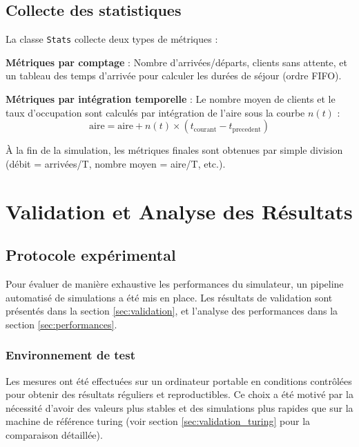 \documentclass[12pt,a4paper]{article}
\begin{document}
\subsection{Collecte des statistiques}

La classe \texttt{Stats} collecte deux types de métriques :

\textbf{Métriques par comptage} : Nombre d'arrivées/départs, clients sans attente, et un tableau des temps d'arrivée pour calculer les durées de séjour (ordre FIFO).

\textbf{Métriques par intégration temporelle} : Le nombre moyen de clients et le taux d'occupation sont calculés par intégration de l'aire sous la courbe $n(t)$ :
\begin{equation}
    \text{aire} = \text{aire} + n(t) \times (t_{\text{courant}} - t_{\text{precedent}})
\end{equation}

À la fin de la simulation, les métriques finales sont obtenues par simple division (débit = arrivées/T, nombre moyen = aire/T, etc.).


\section{Validation et Analyse des Résultats}

\subsection{Protocole expérimental}

Pour évaluer de manière exhaustive les performances du simulateur, un pipeline automatisé de simulations a été mis en place. Les résultats de validation sont présentés dans la section \ref{sec:validation}, et l'analyse des performances dans la section \ref{sec:performances}.

\subsubsection{Environnement de test}

Les mesures ont été effectuées sur un ordinateur portable en conditions contrôlées pour obtenir des résultats réguliers et reproductibles. Ce choix a été motivé par la nécessité d'avoir des valeurs plus stables et des simulations plus rapides que sur la machine de référence turing (voir section \ref{sec:validation_turing} pour la comparaison détaillée).
\end{document}
